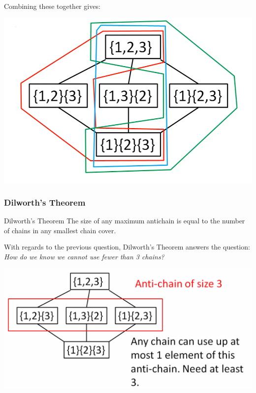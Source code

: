 \documentclass[letterpaper]{article}
\begin{document}
\begin{itemize}
\begin{center}
    \end{center}
    Combining these together gives:
    \begin{center}
        \includegraphics[scale=0.5]{img/hasse_4.PNG}
    \end{center}
\end{itemize}

\subsubsection{Dilworth's Theorem}
\begin{theorem}{Dilworth's Theorem}{}
    The size of any maximum antichain is equal to the number of chains in any smallest chain cover. 
\end{theorem}

With regards to the previous question, Dilworth's Theorem answers the question: \emph{How do we know we cannot use fewer than 3 chains? }
\begin{center}
    \includegraphics[scale=0.25]{img/hasse_dil.PNG}
\end{center}
\end{document}

